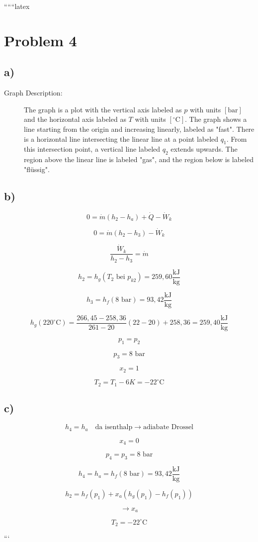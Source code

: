 
``````latex


\section*{Problem 4}

\subsection*{a)}

\begin{description}
    \item[Graph Description:] The graph is a plot with the vertical axis labeled as \( p \) with units \([ \text{bar} ]\) and the horizontal axis labeled as \( T \) with units \([ ^\circ \text{C} ]\). The graph shows a line starting from the origin and increasing linearly, labeled as "fast". There is a horizontal line intersecting the linear line at a point labeled \( q_1 \). From this intersection point, a vertical line labeled \( q_2 \) extends upwards. The region above the linear line is labeled "gas", and the region below is labeled "flüssig".
\end{description}

\subsection*{b)}

\[
0 = \dot{m} (h_2 - h_a) + \dot{Q} - \dot{W}_k
\]

\[
0 = \dot{m} (h_2 - h_3) - \dot{W}_k
\]

\[
\frac{\dot{W}_k}{h_2 - h_3} = \dot{m}
\]

\[
h_2 = h_g \left( T_2 \text{ bei } p_{k2} \right) = 259,60 \frac{\text{kJ}}{\text{kg}}
\]

\[
h_3 = h_f \left( 8 \text{ bar} \right) = 93,42 \frac{\text{kJ}}{\text{kg}}
\]

\[
h_g (220^\circ \text{C}) = \frac{266,45 - 258,36}{261 - 20} (22 - 20) + 258,36 = 259,40 \frac{\text{kJ}}{\text{kg}}
\]

\[
p_1 = p_2
\]

\[
p_3 = 8 \text{ bar}
\]

\[
x_2 = 1
\]

\[
T_2 = T_1 - 6K = -22^\circ \text{C}
\]

\subsection*{c)}

\[
h_4 = h_a \quad \text{da isenthalp} \rightarrow \text{adiabate Drossel}
\]

\[
x_4 = 0
\]

\[
p_4 = p_3 = 8 \text{ bar}
\]

\[
h_4 = h_a = h_f (8 \text{ bar}) = 93,42 \frac{\text{kJ}}{\text{kg}}
\]

\[
h_2 = h_f (p_1) + x_a (h_g (p_1) - h_f (p_1))
\]

\[
\rightarrow x_a
\]

\[
T_2 = -22^\circ \text{C}
\]

```